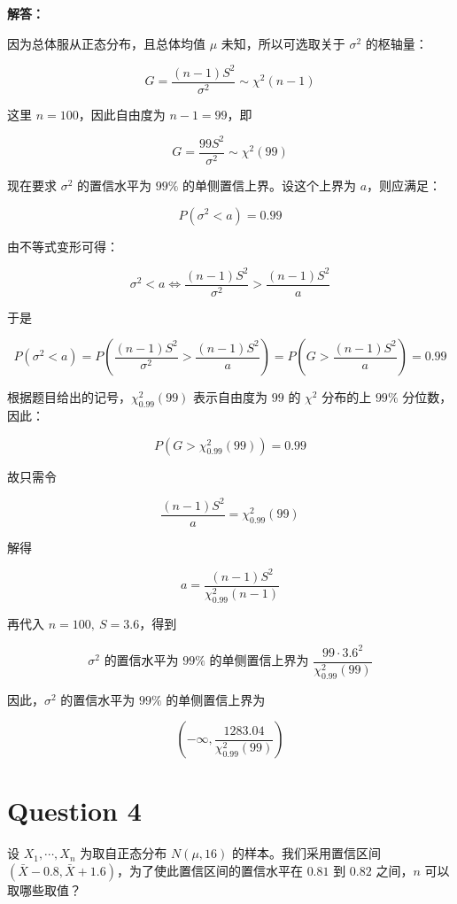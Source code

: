 \documentclass[12pt,a4paper]{article}
\begin{document}
\begin{answerbox}
\textbf{解答：}

因为总体服从正态分布，且总体均值 $\mu$ 未知，所以可选取关于 $\sigma^2$ 的枢轴量：

$$
G=\frac{(n-1)S^2}{\sigma^2}\sim \chi^2(n-1)
$$

这里 $n=100$，因此自由度为 $n-1=99$，即

$$
G=\frac{99S^2}{\sigma^2}\sim \chi^2(99)
$$

现在要求 $\sigma^2$ 的置信水平为 $99\%$ 的单侧置信上界。设这个上界为 $a$，则应满足：

$$
P(\sigma^2<a)=0.99
$$

由不等式变形可得：

$$
\sigma^2<a
\iff
\frac{(n-1)S^2}{\sigma^2}>\frac{(n-1)S^2}{a}
$$

于是

$$
P(\sigma^2<a)
=
P\left(\frac{(n-1)S^2}{\sigma^2}>\frac{(n-1)S^2}{a}\right)
=
P\left(G>\frac{(n-1)S^2}{a}\right)
=0.99
$$

根据题目给出的记号，$\chi^2_{0.99}(99)$ 表示自由度为 $99$ 的 $\chi^2$ 分布的上 $99\%$ 分位数，因此：

$$
P\left(G>\chi^2_{0.99}(99)\right)=0.99
$$

故只需令

$$
\frac{(n-1)S^2}{a}=\chi^2_{0.99}(99)
$$

解得

$$
a = \frac{(n-1)S^2}{\chi^2_{0.99}(n-1)}
$$

再代入 $n=100,\ S=3.6$，得到

$$
\sigma^2 \text{ 的置信水平为 }99\%\text{ 的单侧置信上界为 }
\frac{99\cdot 3.6^2}{\chi^2_{0.99}(99)}
$$

因此，$\sigma^2$ 的置信水平为 $99\%$ 的单侧置信上界为

$$
\left(-\infty, \frac{1283.04}{\chi^2_{0.99}(99)} \right)
$$

\end{answerbox}

\section{Question 4}

设 $X_1,\cdots,X_n$ 为取自正态分布 $N(\mu,16)$ 的样本。我们采用置信区间 $(\bar{X} - 0.8, \bar{X} + 1.6)$，为了使此置信区间的置信水平在 $0.81$ 到 $0.82$ 之间，$n$ 可以取哪些取值？
\end{document}
